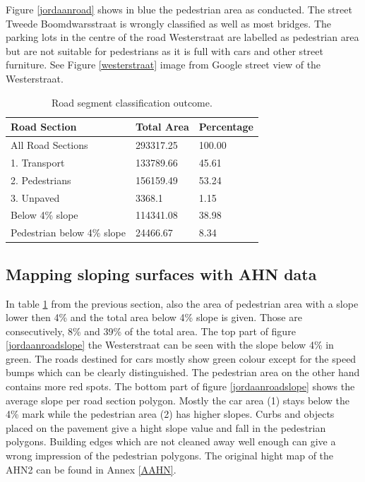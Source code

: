 Figure \ref{jordaanroad} shows in blue the pedestrian area as conducted. The street Tweede Boomdwarsstraat is wrongly classified as well as most bridges. The parking lots in the centre of the road Westerstraat are labelled as pedestrian area but are not suitable for pedestrians as it is full with cars and other street furniture. See Figure \ref{westerstraat} image from Google street view of the Westerstraat. 
\renewcommand{\arraystretch}{1.5}
\renewcommand{\tabcolsep}{0.2cm}
\begin{table}[h]
\caption{Road segment classification outcome. \label{statroadsections}}
\centering
\begin{tabular}{|p{125pt}|p{125pt}|p{125pt}|}
\hline
Road Section & Total Area	& Percentage\\
\hline
All Road Sections & 293317.25 & 100.00\\
\hline
1. Transport & 133789.66 & 45.61\\
2. Pedestrians & 156159.49 & 53.24\\
3. Unpaved	& 3368.1 & 1.15\\
\hline
Below 4\% slope & 114341.08 & 38.98\\
Pedestrian below 4\% slope & 24466.67 & 8.34\\
\hline
\end{tabular}
\end{table}


\subsection{Mapping sloping surfaces with AHN data}
In table \ref{statroadsections} from the previous section, also the area of pedestrian area with a slope lower then 4\% and the total area below 4\% slope is given. Those are consecutively, 8\% and 39\% of the total area.
The top part of figure \ref{jordaanroadslope} the Westerstraat can be seen with the slope below 4\% in green. The roads destined for cars mostly show green colour except for the speed bumps which can be clearly distinguished. The pedestrian area on the other hand contains more red spots. The bottom part of figure \ref{jordaanroadslope} shows the average slope per road section polygon. Mostly the car area (1) stays below the 4\% mark while the pedestrian area (2) has higher slopes. Curbs and objects placed on the pavement give a hight slope value and fall in the pedestrian polygons. Building edges which are not cleaned away well enough can give a wrong impression of the pedestrian polygons. The original hight map of the AHN2 can be found in Annex \ref{AAHN}.

